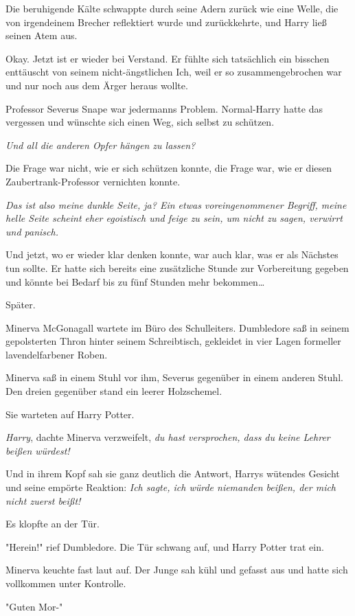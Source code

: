 {Die beruhigende Kälte schwappte durch seine Adern zurück wie eine Welle, die von irgendeinem Brecher reflektiert wurde und zurückkehrte, und Harry ließ seinen Atem aus.

Okay. Jetzt ist er wieder bei Verstand. Er fühlte sich tatsächlich ein bisschen enttäuscht von seinem nicht-ängstlichen Ich, weil er so zusammengebrochen war und nur noch aus dem Ärger heraus wollte.

Professor Severus Snape war jedermanns Problem. Normal-Harry hatte das vergessen und wünschte sich einen Weg, sich selbst zu schützen.

\emph{Und all die anderen Opfer hängen zu lassen?}

Die Frage war nicht, wie er sich schützen konnte, die Frage war, wie er diesen Zaubertrank-Professor vernichten konnte.

\emph{Das ist also meine dunkle Seite, ja? Ein etwas voreingenommener Begriff, meine helle Seite scheint eher egoistisch und feige zu sein, um nicht zu sagen, verwirrt und panisch.}

Und jetzt, wo er wieder klar denken konnte, war auch klar, was er als Nächstes tun sollte. Er hatte sich bereits eine zusätzliche Stunde zur Vorbereitung gegeben und könnte bei Bedarf bis zu fünf Stunden mehr bekommen…

Später.

Minerva McGonagall wartete im Büro des Schulleiters. Dumbledore saß in seinem gepolsterten Thron hinter seinem Schreibtisch, gekleidet in vier Lagen formeller lavendelfarbener Roben.

Minerva saß in einem Stuhl vor ihm, Severus gegenüber in einem anderen Stuhl. Den dreien gegenüber stand ein leerer Holzschemel.

Sie warteten auf Harry Potter.

\emph{Harry}, dachte Minerva verzweifelt, \emph{du hast versprochen, dass du keine Lehrer beißen würdest!}

Und in ihrem Kopf sah sie ganz deutlich die Antwort, Harrys wütendes Gesicht und seine empörte Reaktion: \emph{Ich sagte, ich würde niemanden beißen, der mich nicht zuerst beißt!}

Es klopfte an der Tür.

"Herein!" rief Dumbledore. Die Tür schwang auf, und Harry Potter trat ein.

Minerva keuchte fast laut auf. Der Junge sah kühl und gefasst aus und hatte sich vollkommen unter Kontrolle.

"Guten Mor-"

}
